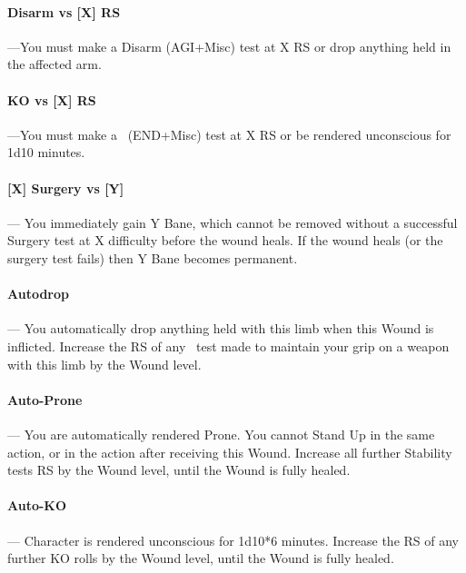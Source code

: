 \documentclass[oneside,11pt,english]{book}
\begin{document}
\vspace{-8pt}\paragraph[Disarm vs. ]{Disarm vs [X] RS}\label{par:Disarm vs}
---\quad You must make a Disarm (AGI+Misc) test at X RS or drop anything held in the affected arm.

\vspace{-5pt}\paragraph[KO vs. ]{KO vs [X] RS }\label{par:KO vs}
---\quad You must make a ~(END+Misc) test at X RS or be rendered unconscious for 1d10 minutes.

\vspace{-5pt}\paragraph[Surgery vs. ]{\label{par:Surgery vs}[X] Surgery vs [Y]}---\quad
You immediately gain Y Bane, which cannot be removed without a successful
Surgery test at X difficulty before the wound heals. If the wound heals (or the
surgery test fails) then Y Bane becomes permanent. 

\vspace{-5pt}\paragraph{\label{par:Autodrop}Autodrop}---\quad 
You automatically drop anything held with this limb when this Wound is
inflicted. Increase the RS of any ~test made to maintain
your grip on a weapon with this limb by the Wound level. %

\vspace{-5pt}\paragraph{\label{par:Auto-Prone}Auto-Prone}---\quad
You are automatically rendered Prone. You cannot Stand Up in the same action, or
in the action after receiving this Wound. Increase all further Stability tests
RS by the Wound level, until the Wound is fully healed. 

\vspace{-5pt}\paragraph{\label{par:Auto-KO}Auto-KO}---\quad
Character is rendered unconscious for 1d10*6 minutes. Increase the RS of any further KO rolls by the Wound level, until the Wound is fully healed.
\end{document}
